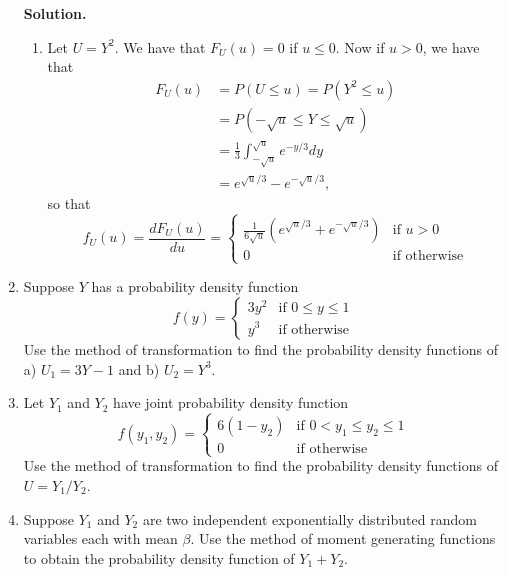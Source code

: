 \documentclass[9pt]{article}
\newcommand{\D}{\displaystyle}
\begin{document}
\begin{enumerate}
      \textbf{Solution.}
      
      \begin{enumerate}
         \item Let $U = Y^2$. We have that $F_U(u) = 0$ if $u \le 0$. Now if
               $u > 0$, we have that 
               \begin{align*}
                  F_U(u) &= P(U \le u) = P(Y^2 \le u) \\
                         &= P(-\sqrt{u} \le Y \le \sqrt{u}) \\
                         &= \frac{1}{3}\int_{-\sqrt{u}}^{\sqrt{u}}e^{-y/3} dy \\
                         &= e^{\sqrt{u}/3} - e^{-\sqrt{u}/3},                     
               \end{align*}
               so that
               \begin{equation*}
                  f_U(u) = \frac{dF_U(u)}{du} = \begin{cases}
                     \D\frac{1}{6\sqrt{u}}\left(e^{\sqrt{u}/3}+e^{-\sqrt{u}/3}\right) & \text{if } u > 0 \\
                     0 & \text{if } \text{otherwise}
                  \end{cases}
               \end{equation*}
      \end{enumerate}
   \item Suppose $Y$ has a probability density function
         \begin{equation*}
            f(y) = \begin{cases}
               3y^2   & \text{if } 0 \le y \le 1 \\
               y^3 & \text{if } \text{otherwise}
            \end{cases}
         \end{equation*}
         Use the method of transformation to find the probability density
         functions of a) $U_1 = 3Y - 1$ and \qquad b) $U_2 = Y^3$.
   \item Let $Y_1$ and $Y_2$ have joint probability density function         
         \begin{equation*}
            f(y_1, y_2) = \begin{cases}
               6(1 - y_2)   & \text{if } 0 < y_1 \le y_2 \le 1 \\
               0 & \text{if } \text{otherwise}
            \end{cases}
         \end{equation*}
         Use the method of transformation to find the probability density
         functions of $U = Y_1 / Y_2$.
         
   \item Suppose $Y_1$ and $Y_2$ are two independent exponentially distributed
         random variables each with mean $\beta$. Use the method of moment
         generating functions to obtain the probability density function of
         $Y_1 + Y_2$.
\end{enumerate}
\end{document}
